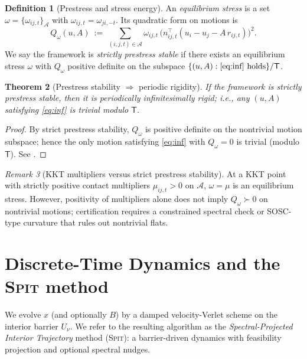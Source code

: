 \documentclass[11pt]{article}
\newtheorem{theorem}{Theorem}[section]
\theoremstyle{remark}
\newtheorem{remark}[theorem]{Remark}
\theoremstyle{definition}
\newtheorem{definition}[theorem]{Definition}
\newcommand{\SPIT}{\textnormal{\textsc{Spit}}} %
\newcommand{\Triv}{\mathsf{T}}                 %
\begin{document}
\begin{definition}[Prestress and stress energy]
An \emph{equilibrium stress} is a set $\omega=\{\omega_{ij,t}\}_{\mathcal{A}}$ with $\omega_{ij,t}=\omega_{ji,-t}$. Its quadratic form on motions is
\begin{equation}\label{eq:Q}
Q_\omega(u,A)\ :=\ \sum_{(i,j,t)\in\mathcal{A}} \omega_{ij,t}\,\bigl(n_{ij,t}^\top(u_i-u_j-A\,r_{ij,t})\bigr)^2.
\end{equation}
We say the framework is \emph{strictly prestress stable} if there exists an equilibrium stress $\omega$ with $Q_\omega$ positive definite on the subspace $\{(u,A):\eqref{eq:inf}\text{ holds}\}/\Triv$.
\end{definition}

\begin{theorem}[Prestress stability $\Rightarrow$ periodic rigidity]\label{thm:periodic-prestress}
If the framework is strictly prestress stable, then it is periodically infinitesimally rigid; i.e., any $(u,A)$ satisfying \eqref{eq:inf} is trivial modulo $\Triv$.
\end{theorem}

\begin{proof}
By strict prestress stability, $Q_\omega$ is positive definite on the nontrivial motion subspace; hence the only motion satisfying \eqref{eq:inf} with $Q_\omega=0$ is trivial (modulo $\Triv$). See \cite{Connelly82,ConnellyWhiteley96,BorceaStreinu10,MalesteinTheran13}.
\end{proof}

\begin{remark}[KKT multipliers versus strict prestress stability]
At a KKT point with strictly positive contact multipliers $\mu_{ij,t}>0$ on $\mathcal{A}$, $\omega=\mu$ is an equilibrium stress. However, positivity of multipliers alone does not imply $Q_\omega\succ 0$ on nontrivial motions; certification requires a constrained spectral check or SOSC-type curvature that rules out nontrivial flats.
\end{remark}

\section{Discrete-Time Dynamics and the \SPIT{} method}\label{sec:dynamics}
We evolve $x$ (and optionally $B$) by a damped velocity-Verlet scheme on the interior barrier $U_\nu$.
We refer to the resulting algorithm as the \emph{Spectral-Projected Interior Trajectory} method (\SPIT): a barrier-driven dynamics with feasibility projection and optional spectral nudges.
\end{document}
